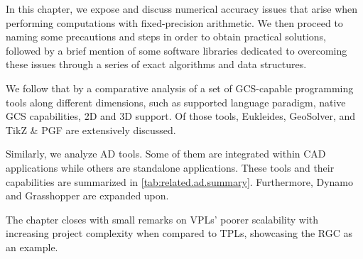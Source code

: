 %
\label{chap:related}
\cleardoublepage{}

\noindent
In this chapter, we expose and discuss numerical accuracy issues that arise when
performing computations with fixed-precision arithmetic.  We then proceed to
naming some precautions and steps in order to obtain practical solutions,
followed by a brief mention of some software libraries dedicated to overcoming
these issues through a series of exact algorithms and data structures.

We follow that by a comparative analysis of a set of \ac{GCS}-capable
programming tools along different dimensions, such as supported language
paradigm, native \ac{GCS} capabilities, 2D and 3D support.  Of those tools,
Eukleides, GeoSolver, and \acs{TikZ} \& \acs{PGF} are extensively discussed.

Similarly, we analyze \ac{AD} tools.  Some of them are integrated within
\ac{CAD} applications while others are standalone applications.  These tools and
their capabilities are summarized in \cref{tab:related.ad.summary}.
Furthermore, Dynamo and Grasshopper are expanded upon.

The chapter closes with small remarks on \acp{VPL}' poorer scalability with
increasing project complexity when compared to \acp{TPL}, showcasing the
\ac{RGC} as an example.





